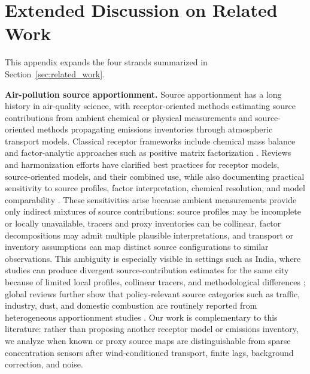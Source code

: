 \section{Extended Discussion on Related Work}
\label{app:extended_related_work}

This appendix expands the four strands summarized in
Section~\ref{sec:related_work}.

\noindent\textbf{Air-pollution source apportionment.}
Source apportionment has a long history in air-quality science, with
receptor-oriented methods estimating source contributions from ambient chemical
or physical measurements and source-oriented methods propagating emissions
inventories through atmospheric transport models. Classical receptor frameworks
include chemical mass balance and factor-analytic approaches such as positive
matrix factorization \citep{watson2002receptor,paatero1994positive,hopke2016review}.
Reviews and harmonization efforts have clarified best practices for receptor
models, source-oriented models, and their combined use, while also documenting
practical sensitivity to source profiles, factor interpretation, chemical
resolution, and model comparability
\citep{viana2008source,belis2013critical,belis2019european,mircea2020european,hopke2020global}.
These sensitivities arise because ambient measurements provide only indirect
mixtures of source contributions: source profiles may be incomplete or locally
unavailable, tracers and proxy inventories can be collinear, factor
decompositions may admit multiple plausible interpretations, and transport or
inventory assumptions can map distinct source configurations to similar
observations. This ambiguity is especially visible in settings such as India,
where studies can produce divergent source-contribution estimates for the same
city because of limited local profiles, collinear tracers, and methodological
differences \citep{pant2012critical}; global reviews further show that
policy-relevant source categories such as traffic, industry, dust, and domestic
combustion are routinely reported from heterogeneous apportionment studies
\citep{karagulian2015contributions}. Our work is complementary to this
literature: rather than proposing another receptor model or emissions inventory,
we analyze when known or proxy source maps are distinguishable from sparse
concentration sensors after wind-conditioned transport, finite lags, background
correction, and noise.

